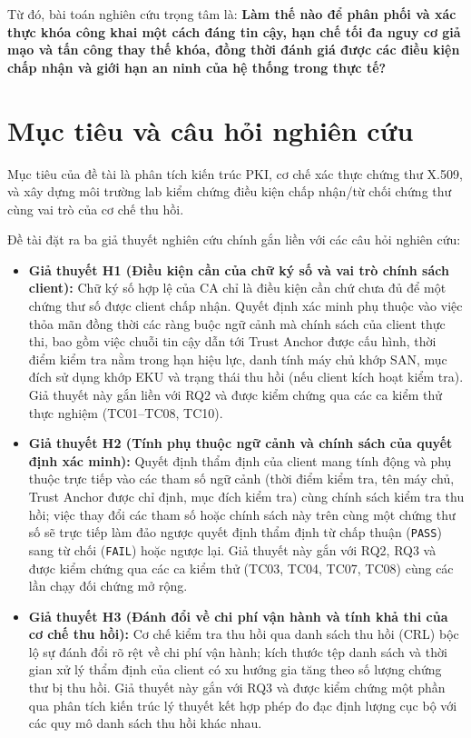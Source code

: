 Từ đó, bài toán nghiên cứu trọng tâm là: \textbf{Làm thế nào để phân phối và xác thực khóa công khai một cách đáng tin cậy, hạn chế tối đa nguy cơ giả mạo và tấn công thay thế khóa, đồng thời đánh giá được các điều kiện chấp nhận và giới hạn an ninh của hệ thống trong thực tế?}

\section{Mục tiêu và câu hỏi nghiên cứu}
\label{sec:objectives-rqs}
Mục tiêu của đề tài là phân tích kiến trúc PKI, cơ chế xác thực chứng thư X.509, và xây dựng môi trường lab kiểm chứng điều kiện chấp nhận/từ chối chứng thư cùng vai trò của cơ chế thu hồi.

Đề tài đặt ra ba giả thuyết nghiên cứu chính gắn liền với các câu hỏi nghiên cứu:
\begin{itemize}
    \item \textbf{Giả thuyết H1 (Điều kiện cần của chữ ký số và vai trò chính sách client):} Chữ ký số hợp lệ của CA chỉ là điều kiện cần chứ chưa đủ để một chứng thư số được client chấp nhận. Quyết định xác minh phụ thuộc vào việc thỏa mãn đồng thời các ràng buộc ngữ cảnh mà chính sách của client thực thi, bao gồm việc chuỗi tin cậy dẫn tới Trust Anchor được cấu hình, thời điểm kiểm tra nằm trong hạn hiệu lực, danh tính máy chủ khớp SAN, mục đích sử dụng khớp EKU và trạng thái thu hồi (nếu client kích hoạt kiểm tra). Giả thuyết này gắn liền với RQ2 và được kiểm chứng qua các ca kiểm thử thực nghiệm (TC01--TC08, TC10).
    \item \textbf{Giả thuyết H2 (Tính phụ thuộc ngữ cảnh và chính sách của quyết định xác minh):} Quyết định thẩm định của client mang tính động và phụ thuộc trực tiếp vào các tham số ngữ cảnh (thời điểm kiểm tra, tên máy chủ, Trust Anchor được chỉ định, mục đích kiểm tra) cùng chính sách kiểm tra thu hồi; việc thay đổi các tham số hoặc chính sách này trên cùng một chứng thư số sẽ trực tiếp làm đảo ngược quyết định thẩm định từ chấp thuận (\texttt{PASS}) sang từ chối (\texttt{FAIL}) hoặc ngược lại. Giả thuyết này gắn với RQ2, RQ3 và được kiểm chứng qua các ca kiểm thử (TC03, TC04, TC07, TC08) cùng các lần chạy đối chứng mở rộng.
    \item \textbf{Giả thuyết H3 (Đánh đổi về chi phí vận hành và tính khả thi của cơ chế thu hồi):} Cơ chế kiểm tra thu hồi qua danh sách thu hồi (CRL) bộc lộ sự đánh đổi rõ rệt về chi phí vận hành; kích thước tệp danh sách và thời gian xử lý thẩm định của client có xu hướng gia tăng theo số lượng chứng thư bị thu hồi. Giả thuyết này gắn với RQ3 và được kiểm chứng một phần qua phân tích kiến trúc lý thuyết kết hợp phép đo đạc định lượng cục bộ với các quy mô danh sách thu hồi khác nhau.
\end{itemize}

